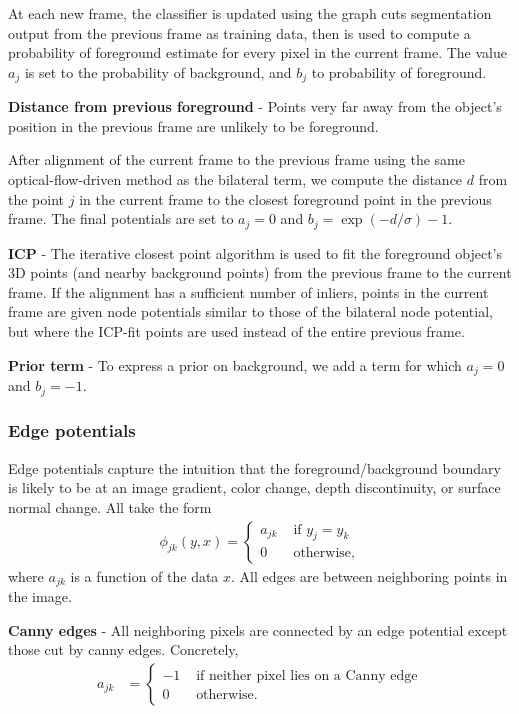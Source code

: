 \documentclass[journal]{IEEEtran}
\begin{document}
At each new frame, the classifier is updated using the graph cuts segmentation output from the previous frame as training data, then is used to compute a probability of foreground estimate for every pixel in the current frame. The value $a_j$ is set to the probability of background, and $b_j$ to probability of foreground.

\textbf{Distance from previous foreground} - Points very far away from the object's position in the previous frame are unlikely to be foreground.

After alignment of the current frame to the previous frame using the same optical-flow-driven method as the bilateral term, we compute the distance $d$ from the point $j$ in the current frame to the closest foreground point in the previous frame.  The final potentials are set to $a_j = 0$ and $b_j = \exp(-d / \sigma) - 1$.

\textbf{ICP} - The iterative closest point algorithm is used to fit the foreground object's 3D points (and nearby background points) from the previous frame to the current frame.  If the alignment has a sufficient number of inliers, points in the current frame are given node potentials similar to those of the bilateral node potential, but where the ICP-fit points are used instead of the entire previous frame.

\textbf{Prior term} - To express a prior on background, we add a term for which $a_j = 0$ and $b_j = -1$.

\subsubsection{Edge potentials}

Edge potentials capture the intuition that the foreground/background boundary is likely to be at an image gradient, color change, depth discontinuity, or surface normal change.  All take the form
\begin{align*}
  \phi_{jk}(y, x) =
  \left\{
  \begin{array}{rl}
    a_{jk} & \mbox{ if } y_j = y_k \\
    0 & \mbox{ otherwise,}
  \end{array}
  \right.
\end{align*}
where $a_{jk}$ is a function of the data $x$.  All edges are between neighboring points in the image.

\textbf{Canny edges} - All neighboring pixels are connected by an edge potential except those cut by canny edges.  Concretely,
\begin{align*}
  a_{jk} & =
  \left\{
  \begin{array}{rl}
    -1 & \mbox{ if neither pixel lies on a Canny edge} \\
    0 & \mbox{ otherwise.}
  \end{array}
  \right.
\end{align*}
\end{document}
